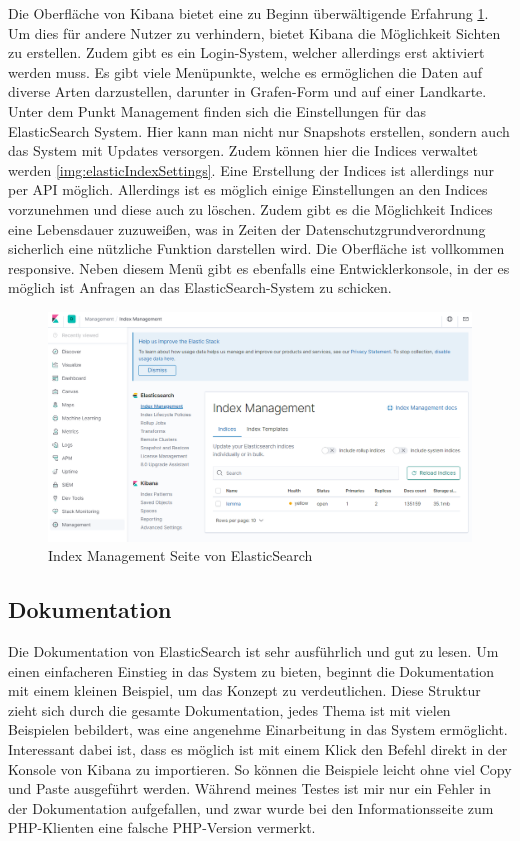 Die Oberfläche von Kibana bietet eine zu Beginn überwältigende Erfahrung \ref{img:elasticInterface}. Um dies für andere Nutzer zu verhindern, bietet Kibana die Möglichkeit Sichten zu erstellen. Zudem gibt es ein Login-System, welcher allerdings erst aktiviert werden muss. Es gibt viele Menüpunkte, welche es ermöglichen die Daten auf diverse Arten darzustellen, darunter in Grafen-Form und auf einer Landkarte. Unter dem Punkt Management finden sich die Einstellungen für das ElasticSearch System. Hier kann man nicht nur Snapshots erstellen, sondern auch das System mit Updates versorgen. Zudem können hier die Indices verwaltet werden \ref{img:elasticIndexSettings}. Eine Erstellung der Indices ist allerdings nur per API möglich. Allerdings ist es möglich einige Einstellungen an den Indices vorzunehmen und diese auch zu löschen. Zudem gibt es die Möglichkeit Indices eine Lebensdauer zuzuweißen, was in Zeiten der Datenschutzgrundverordnung sicherlich eine nützliche Funktion darstellen wird. Die Oberfläche ist vollkommen responsive. Neben diesem Menü gibt es ebenfalls eine Entwicklerkonsole, in der es möglich ist Anfragen an das ElasticSearch-System zu schicken. 

\begin{figure}
	\centering
	\includegraphics[width=1\linewidth]{images/elastic_ui.png}
	\caption{Index Management Seite von ElasticSearch}
	\label{img:elasticInterface}
\end{figure}


\subsection{Dokumentation}

Die Dokumentation von ElasticSearch ist sehr ausführlich und gut zu lesen. Um einen einfacheren Einstieg in das System zu bieten, beginnt die Dokumentation mit einem kleinen Beispiel, um das Konzept zu verdeutlichen. Diese Struktur zieht sich durch die gesamte Dokumentation, jedes Thema ist mit vielen Beispielen bebildert, was eine angenehme Einarbeitung in das System ermöglicht. Interessant dabei ist, dass es möglich ist mit einem Klick den Befehl direkt in der Konsole von Kibana zu importieren. So können die Beispiele leicht ohne viel Copy und Paste ausgeführt werden. Während meines Testes ist mir nur ein Fehler in der Dokumentation aufgefallen, und zwar wurde bei den Informationsseite zum PHP-Klienten eine falsche PHP-Version vermerkt.


